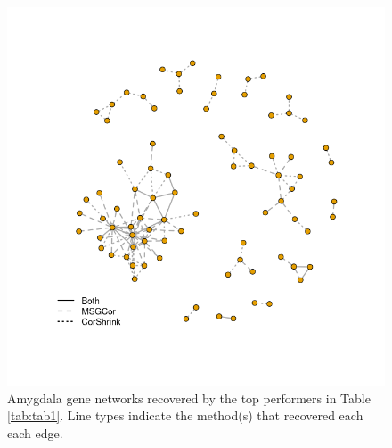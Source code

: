 \documentclass[useAMS,referee,usenatbib]{biom}
\begin{document}
\begin{figure}
  \begin{center}
    \includegraphics[width=0.45\textheight]{img/networks_A_2.png}
  \end{center}
\caption{Amygdala gene networks recovered by the top performers in Table \ref{tab:tab1}. Line types indicate the method(s) that recovered each each edge.}
\label{network_A}
\end{figure}
\end{document}
